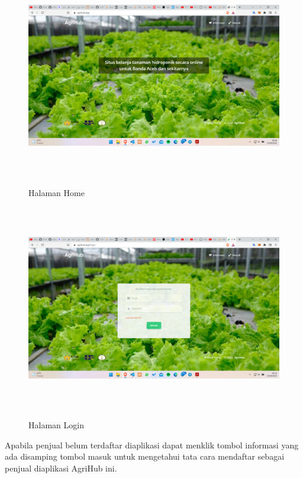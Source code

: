 \begin{enumerate}
\begin{enumerate}
			\begin{figure}[H]
				\centering
				{\includegraphics [width = 14.3cm, height= 9cm]{gambar/homepage}}
				\caption{Halaman Home}
				\label{homepage}
			\end{figure}

			\begin{figure}[H]
				\centering
				{\includegraphics [width = 14.3cm, height= 9cm]{gambar/login}}
				\caption{Halaman Login}
				\label{login}
			\end{figure}

			\par Apabila penjual belum terdaftar diaplikasi dapat menklik tombol informasi yang ada disamping tombol masuk untuk mengetahui tata cara mendaftar sebagai penjual diaplikasi AgriHub ini.


\end{enumerate}
\end{enumerate}
